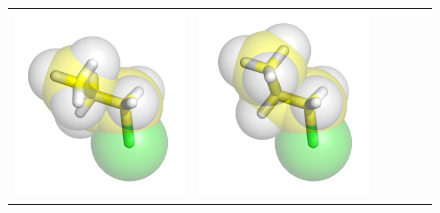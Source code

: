 \documentclass{svmult}
\begin{document}
\begin{figure}
\begin{tabular}{cccccc}
\includegraphics[width=\tmpa]{fig/m003-003} & 
\includegraphics[width=\tmpa]{fig/m003-004} & 

\end{tabular}
\end{figure}
\end{document}
